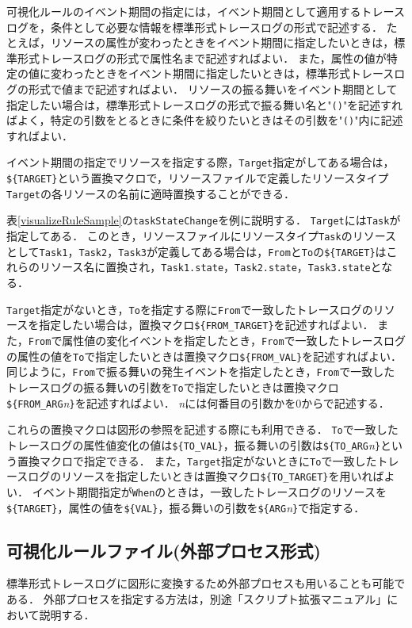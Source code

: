 \begin{description}
{\begin{description}
    \end{description}
}
\end{description}

可視化ルールのイベント期間の指定には，イベント期間として適用するトレースログを，条件として必要な情報を標準形式トレースログの形式で記述する．
たとえば，リソースの属性が変わったときをイベント期間に指定したいときは，標準形式トレースログの形式で属性名まで記述すればよい．
また，属性の値が特定の値に変わったときをイベント期間に指定したいときは，標準形式トレースログの形式で値まで記述すればよい．
リソースの振る舞いをイベント期間として指定したい場合は，標準形式トレースログの形式で振る舞い名と"{\tt ()}"を記述すればよく，特定の引数をとるときに条件を絞りたいときはその引数を"{\tt ()}"内に記述すればよい．

イベント期間の指定でリソースを指定する際，{\tt Target}指定がしてある場合は，\verb|${TARGET}|という置換マクロで，リソースファイルで定義したリソースタイプ{\tt Target}の各リソースの名前に適時置換することができる．

表\ref{visualizeRuleSample}の{\tt taskStateChange}を例に説明する．
{\tt Target}には{\tt Task}が指定してある．
このとき，リソースファイルにリソースタイプ{\tt Task}のリソースとして{\tt Task1}，{\tt Task2}，{\tt Task3}が定義してある場合は，{\tt From}と{\tt To}の\verb|${TARGET}|はこれらのリソース名に置換され，{\tt Task1.state}，{\tt Task2.state}，{\tt Task3.state}となる．

{\tt Target}指定がないとき，{\tt To}を指定する際に{\tt From}で一致したトレースログのリソースを指定したい場合は，置換マクロ\verb|${FROM_TARGET}|を記述すればよい．
また，{\tt From}で属性値の変化イベントを指定したとき，{\tt From}で一致したトレースログの属性の値を{\tt To}で指定したいときは置換マクロ\verb|${FROM_VAL}|を記述すればよい．
同じように，{\tt From}で振る舞いの発生イベントを指定したとき，{\tt From}で一致したトレースログの振る舞いの引数を{\tt To}で指定したいときは置換マクロ\verb|${FROM_ARG|{\it n}\verb|}|を記述すればよい．
{\it n}には何番目の引数かを0からで記述する．

これらの置換マクロは図形の参照を記述する際にも利用できる．
{\tt To}で一致したトレースログの属性値変化の値は\verb|${TO_VAL}|，振る舞いの引数は\verb|${TO_ARG|{\it n}\verb|}|という置換マクロで指定できる．
また，{\tt Target}指定がないときに{\tt To}で一致したトレースログのリソースを指定したいときは置換マクロ\verb|${TO_TARGET}|を用いればよい．
イベント期間指定が{\tt When}のときは，一致したトレースログのリソースを\verb|${TARGET}|，属性の値を\verb|${VAL}|，振る舞いの引数を\verb|${ARG|{\it n}\verb|}|で指定する．

\subsection{可視化ルールファイル(外部プロセス形式)}
標準形式トレースログに図形に変換するため外部プロセスも用いることも可能である．
外部プロセスを指定する方法は，別途「スクリプト拡張マニュアル」において説明する．
